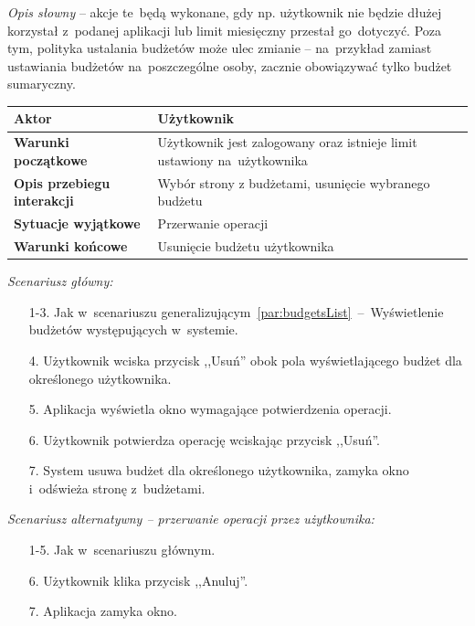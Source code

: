 \textit{Opis słowny} -- akcje te~będą wykonane, gdy np. użytkownik nie będzie dłużej korzystał z~podanej aplikacji lub limit miesięczny przestał go~dotyczyć. Poza tym, polityka ustalania budżetów może ulec zmianie -- na~przykład zamiast ustawiania budżetów na~poszczególne osoby, zacznie obowiązywać tylko budżet sumaryczny.

\begin{longtable}{|p{5cm}|p{7cm}|}
  \hline \textbf{Aktor} & Użytkownik \\
  \hline \textbf{Warunki początkowe} & Użytkownik jest zalogowany oraz istnieje limit ustawiony na~użytkownika \\
  \hline \textbf{Opis przebiegu interakcji} & Wybór strony z budżetami, usunięcie wybranego budżetu \\
  \hline \textbf{Sytuacje wyjątkowe} & Przerwanie operacji \\
  \hline \textbf{Warunki końcowe} & Usunięcie budżetu użytkownika \\
  \hline
\end{longtable}

\noindent \textit{Scenariusz główny:}
\begin{enumerate}
  \item[1-3.] Jak w~scenariuszu generalizującym~\ref{par:budgetsList}~--~Wyświetlenie budżetów występujących w~systemie.
  \item[4.] Użytkownik wciska przycisk ,,Usuń'' obok pola wyświetlającego budżet dla określonego użytkownika.
  \item[5.] Aplikacja wyświetla okno wymagające potwierdzenia operacji.
  \item[6.] Użytkownik potwierdza operację wciskając przycisk ,,Usuń''.
  \item[7.] System usuwa budżet dla określonego użytkownika, zamyka okno i~odświeża stronę z~budżetami.
\end{enumerate}

\noindent \textit{Scenariusz alternatywny -- przerwanie operacji przez użytkownika:}
\begin{enumerate}
  \item[1-5.] Jak w~scenariuszu głównym.
  \item[6.] Użytkownik klika przycisk ,,Anuluj''.
  \item[7.] Aplikacja zamyka okno.
\end{enumerate}

